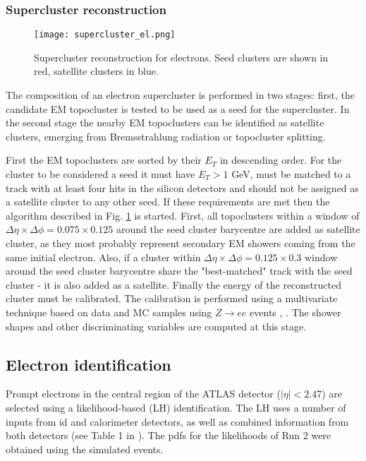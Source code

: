  	\subsubsection{Supercluster reconstruction}
 	\begin{figure}[htbp]
 		\centering
 		\texttt{[image: supercluster\_el.png]}
 		\caption[Supercluster]{Supercluster reconstruction for electrons. Seed clusters are shown in red, satellite clusters in blue.}
 		\label{fig::supercluster}
 	\end{figure}
 	The composition of an electron supercluster is performed in two stages: first, the candidate EM topocluster is tested to be used as a seed for the supercluster. In the second stage the nearby EM topoclusters can be identified as satellite clusters, emerging from Bremsstrahlung radiation or topocluster splitting.
 	
 	First the EM topoclusters are sorted by their $E_T$ in descending order. For the cluster to be considered a seed it must have $E_T>1$ GeV, must be matched to a track with at least four hits in the silicon detectors and should not be assigned as a satellite cluster to any other seed. If these requirements are met then the algorithm described in Fig. \ref{fig::supercluster} is started. First, all topoclusters within a window of  $\Delta \eta \times \Delta \phi = 0.075 \times 0.125$ around the seed cluster barycentre are added as satellite cluster, as they most probably represent secondary EM showers coming from the same initial electron. Also, if a cluster within $\Delta \eta \times \Delta \phi = 0.125 \times 0.3$ window around the seed cluster barycentre share the "best-matched" track with the seed cluster - it is also added as a satellite.
  	Finally the energy of the reconstructed cluster must be calibrated. The calibration is performed using a multivariate technique based on data and MC samples using $Z \rightarrow ee$ events \cite{Aaboud:2018ugz}, \cite {Aaboud:2018yqu}. The shower shapes and other discriminating variables are computed at this stage.
    \subsection{Electron identification}
    Prompt electrons in the central region of the ATLAS detector ($|\eta|<2.47$) are selected using a likelihood-based (LH) identification. The LH uses a number of inputs from \gls{id} and calorimeter detectors, as well as combined information from both detectors (see Table 1 in \cite{electrons_reco1}). The \gls{pdfs} for the likelihoods of Run 2 were obtained using the simulated events.
    
